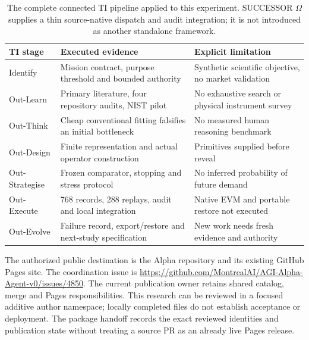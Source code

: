 \documentclass[11pt,letterpaper]{article}
\begin{document}
\begin{table}[H]
\centering\small
\begin{tabularx}{\linewidth}{@{}p{.18\linewidth}XX@{}}
\toprule
\textbf{TI stage} & \textbf{Executed evidence} & \textbf{Explicit limitation}\\
\midrule
Identify & Mission contract, purpose threshold and bounded authority & Synthetic scientific objective, no market validation\\
Out-Learn & Primary literature, four repository audits, NIST pilot & No exhaustive search or physical instrument survey\\
Out-Think & Cheap conventional fitting falsifies an initial bottleneck & No measured human reasoning benchmark\\
Out-Design & Finite representation and actual operator construction & Primitives supplied before reveal\\
Out-Strategise & Frozen comparator, stopping and stress protocol & No inferred probability of future demand\\
Out-Execute & 768 records, 288 replays, audit and local integration & Native EVM and portable restore not executed\\
Out-Evolve & Failure record, export/restore and next-study specification & New work needs fresh evidence and authority\\
\bottomrule
\end{tabularx}
\caption{The complete connected TI pipeline applied to this experiment. SUCCESSOR $\Omega$ supplies a thin source-native dispatch and audit integration; it is not introduced as another standalone framework.}
\end{table}

The authorized public destination is the Alpha repository and its existing GitHub Pages site. The coordination issue is \url{https://github.com/MontrealAI/AGI-Alpha-Agent-v0/issues/4850}. The current publication owner retains shared catalog, merge and Pages responsibilities. This research can be reviewed in a focused additive author namespace; locally completed files do not establish acceptance or deployment. The package handoff records the exact reviewed identities and publication state without treating a source PR as an already live Pages release.
\end{document}
